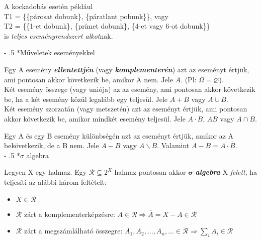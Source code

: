 \documentclass[tikz,12pt,margin=0px]{article}
\makeatletter
\renewcommand\paragraph{%
	\@startsection{paragraph}{4}{0mm}%
	{-\baselineskip}%
	{.5\baselineskip}%
	{\normalfont\normalsize\bfseries}}
\makeatother
\begin{document}
    {\small
    \noindent A kockadobás esetén például\\
    T1 = \{\{párosat dobunk\}, \{páratlant pobunk\}\}, vagy\\
    T2 = \{\{1-et dobunk\}, \{prímet dobunk\}, \{4-et vagy 6-ot dobunk\}\}\\
    is \emph{teljes eseményrendszert alkot}nak.
    }

    \paragraph*{Műveletek eseményekkel\\}

    \noindent Egy A esemény \textbf{\emph{ellentettjén}} (vagy \textbf{\emph{komplementerén}}) azt az eseményt értjük, ami pontosan akkor következik be, amikor A nem. Jele $\overline{A}$.  (Pl: $\overline{\Omega} = \varnothing$).\\

    \noindent Két esemény összege (vagy uniója) az az esemény, ami pontosan akkor következik be, ha a két esemény közül legalább egy teljesül. Jele $A + B$ vagy $A \cup B$.\\

    \noindent Két esemény szorzatán (vagy metszetén) azt az eseményt értjük, ami pontosan akkor következik be, amikor mindkét esemény teljesül. Jele $A \cdot B$, $AB$ vagy $A \cap B$.

    \noindent Egy A és egy B esemény különbségén azt az eseményt értjük, amikor az A bekövetkezik, de a B nem. Jele $A  -B$ vagy $A \backslash B$.
    Valamint $A - B = A \cdot \overline{B}$.\\
\newpage
    \paragraph*{$\sigma$ algebra}

    \noindent Legyen X egy halmaz. Egy $\mathcal{R} \subseteq 2^{X}$ halmaz pontosan akkor $\boldsymbol{\sigma}$ \textbf{\emph{algebra}} X \emph{felett}, ha teljesíti az alábbi három feltételt:
    \begin{itemize}
        \item $X \in \mathcal{R}$
        \item $\mathcal{R}$ zárt a komplementerképzésre: $A \in \mathcal{R} \Rightarrow \overline{A} = X - A \in \mathcal{R}$
        \item $\mathcal{R}$ zárt a megszámlálható összegre: $A_1, A_2, \ldots, A_n, \ldots \in \mathcal{R} \Rightarrow  \sum\limits_{i}A_i \in \mathcal{R}$
    \end{itemize}
\end{document}
